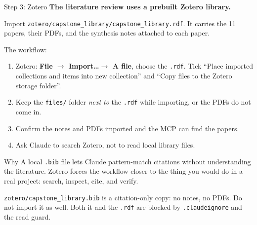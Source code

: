 \documentclass[aspectratio=169, 11pt]{beamer}
\begin{document}
\begin{frame}[shrink=6]{Step 3: Zotero}
  \textbf{The literature review uses a prebuilt Zotero library.}

  \vspace{0.4em}
  Import \texttt{zotero/capstone\_library/capstone\_library.rdf}. It carries the 11 papers, their PDFs, and the synthesis notes attached to each paper.

  \vspace{0.5em}
  The workflow:
  \begin{enumerate}\small
    \item Zotero: \textbf{File $\rightarrow$ Import\ldots $\rightarrow$ A file}, choose the \texttt{.rdf}. Tick ``Place imported collections and items into new collection'' and ``Copy files to the Zotero storage folder''.
    \item Keep the \texttt{files/} folder \emph{next to} the \texttt{.rdf} while importing, or the PDFs do not come in.
    \item Confirm the notes and PDFs imported and the MCP can find the papers.
    \item Ask Claude to search Zotero, not to read local library files.
  \end{enumerate}

  \vspace{0.6em}
  \begin{block}{Why}
    A local \texttt{.bib} file lets Claude pattern-match citations without understanding the literature. Zotero forces the workflow closer to the thing you would do in a real project: search, inspect, cite, and verify.
  \end{block}

  \vspace{0.3em}
  \alert{\small \texttt{zotero/capstone\_library.bib} is a citation-only copy: no notes, no PDFs. Do not import it as well. Both it and the \texttt{.rdf} are blocked by \texttt{.claudeignore} and the read guard.}
\end{frame}
\end{document}
